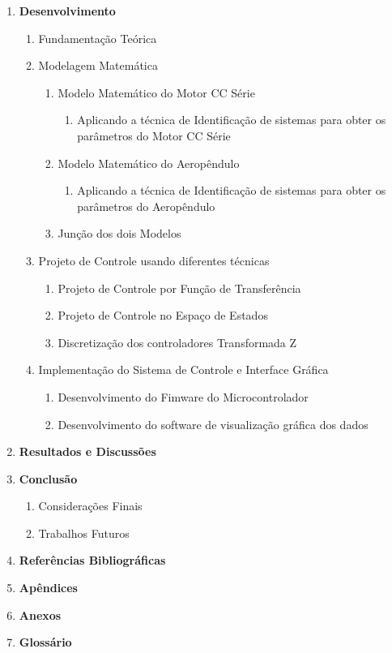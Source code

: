 \documentclass[12pt,oneside,a4paper,brazil]{abntex2}
\begin{document}
\begin{enumerate}
		\item \textbf{Desenvolvimento}
		\begin{enumerate}
			\item Fundamentação Teórica
			\item Modelagem Matemática
			\begin{enumerate}
				\item Modelo Matemático do Motor CC Série
					\begin{enumerate}
					\item Aplicando a técnica de Identificação de sistemas para obter os parâmetros do Motor CC Série
					\end{enumerate}
				\item Modelo Matemático do Aeropêndulo
					\begin{enumerate}
						\item Aplicando a técnica de Identificação de sistemas para obter os parâmetros do Aeropêndulo
					\end{enumerate}
				\item Junção dos dois Modelos
			\end{enumerate}
			
			
			\item Projeto de Controle usando diferentes técnicas
			\begin{enumerate}
				\item Projeto de Controle por Função de Transferência
				\item Projeto de Controle no Espaço de Estados
				\item Discretização dos controladores Transformada Z
			\end{enumerate}
		
		
			\item Implementação do Sistema de Controle e Interface Gráfica
			\begin{enumerate}
				\item Desenvolvimento do Fimware do Microcontrolador
				\item Desenvolvimento do software de visualização gráfica dos dados
			\end{enumerate}
		\end{enumerate}
		
		\item \textbf{Resultados e Discussões}
		
		
		\item \textbf{Conclusão}
		\begin{enumerate}
			\item Considerações Finais
			\item Trabalhos Futuros
		\end{enumerate}
		
		\item \textbf{Referências Bibliográficas}
		\item \textbf{Apêndices}
		\item \textbf{Anexos}
		\item \textbf{Glossário}
	\end{enumerate}
\end{document}
